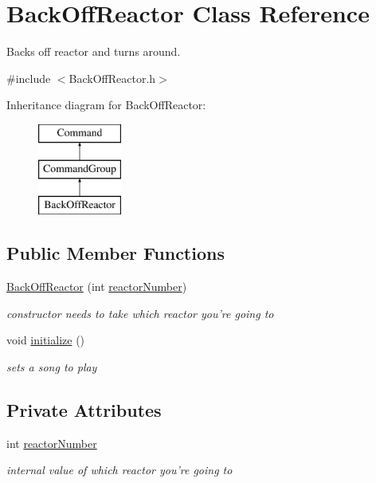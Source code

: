 \hypertarget{classBackOffReactor}{\section{Back\-Off\-Reactor Class Reference}
\label{classBackOffReactor}
}


Backs off reactor and turns around.  




{\ttfamily \#include $<$Back\-Off\-Reactor.\-h$>$}

Inheritance diagram for Back\-Off\-Reactor\-:\begin{figure}[H]
\begin{center}
\leavevmode
\includegraphics[height=3.000000cm]{classBackOffReactor}
\end{center}
\end{figure}
\subsection*{Public Member Functions}
\begin{DoxyCompactItemize}
\item 
\hyperlink{classBackOffReactor_a4c7c2c714dcdab2d80f1ba851beab5b8}{Back\-Off\-Reactor} (int \hyperlink{classBackOffReactor_ae5b8f5714a059f48405fd6ab7b3de851}{reactor\-Number})
\begin{DoxyCompactList}\small\item\em constructor needs to take which reactor you're going to \end{DoxyCompactList}\item 
void \hyperlink{classBackOffReactor_a8e18c33979bac064a061382c8890a6b7}{initialize} ()
\begin{DoxyCompactList}\small\item\em sets a song to play \end{DoxyCompactList}\end{DoxyCompactItemize}
\subsection*{Private Attributes}
\begin{DoxyCompactItemize}
\item 
int \hyperlink{classBackOffReactor_ae5b8f5714a059f48405fd6ab7b3de851}{reactor\-Number}
\begin{DoxyCompactList}\small\item\em internal value of which reactor you're going to \end{DoxyCompactList}\end{DoxyCompactItemize}
